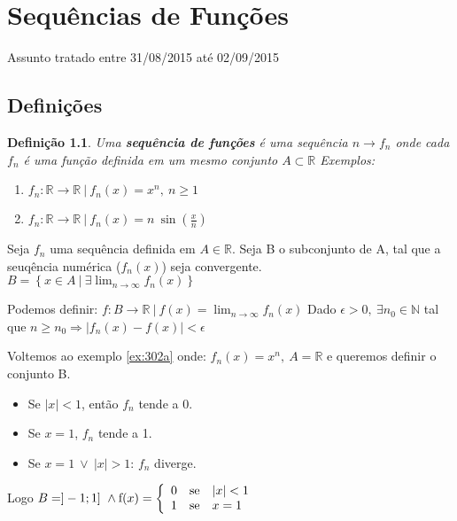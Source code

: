 \documentclass[12pt,openany, letterpaper]{book}
\newtheorem{definition}{Definição}[section]
\begin{document}
\chapter{Sequências de Funções} Assunto tratado entre 31/08/2015 até 02/09/2015
\label{chap:c3}

\section{Definições}

\begin{definition} Uma \textbf{sequência de funções} é uma sequência $n \rightarrow f_n$ onde cada $f_n$ é uma função definida em um mesmo conjunto $A \subset \mathds{R}$ Exemplos: \begin{enumerate}
\item $f_n: \mathds{R} \rightarrow \mathds{R} \ | \ f_n(x) = x^n, \ n \geq 1$ \label{ex:302a}
\item $f_n: \mathds{R} \rightarrow \mathds{R} \ | \ f_n(x) = n\ \displaystyle{\sin \left( \frac{x}{n}\right)}$ \label{ex:302b}
\end{enumerate}
\end{definition}

Seja $f_n$ uma sequência definida em $A \in \mathds{R}$. Seja B o subconjunto de A, tal que a seuqência numérica ($f_n(x)$) seja convergente. $B = \left\{x \in A\ | \ \exists \lim_{n \rightarrow \infty} f_n(x) \right\}$

Podemos definir: $f: B \rightarrow \mathds{R} \ | \ f(x) = \displaystyle{\lim_{n \rightarrow \infty} f_n(x)}$ Dado $\epsilon > 0, \ \exists n_0 \in \mathds{N}$ tal que $n \geq n_0 \Rightarrow |f_n(x) - f(x)| < \epsilon$

Voltemos ao exemplo \ref{ex:302a} onde: $f_n(x) = x^n, \ A = \mathds{R}$ e queremos definir o conjunto B.

\begin{itemize}
\item Se $|x| < 1$, então $f_n$ tende a 0.
\item Se $x=1$, $f_n$ tende a 1.
\item Se $x=1 \ \lor \ |x| > 1$: $f_n$ diverge.
\end{itemize}
Logo $B = ]-1;1]\ \land \hbox{f}(x)
= \left\{ \begin{array}{rll}
0 & \hbox{se} &  |x| < 1 \\
1 & \hbox{se} &  x  = 1 \\
\end{array}\right.$
\end{document}
